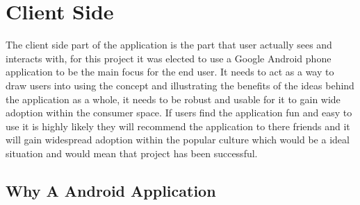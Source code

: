 \section{Client Side}


The client side part of the application is the part that user actually sees and interacts with, for this project it was elected to use a Google Android phone application to be the main focus for the end user. It needs to act as a way to draw users into using the concept and illustrating the benefits of the ideas behind the application as a whole, it needs to be robust and usable for it to gain wide adoption within the consumer space. If users find the application fun and easy to use it is highly likely they will recommend the application to there friends and it will gain widespread adoption within the popular culture which would be a ideal situation and would mean that project has been successful.\\

\subsection{Why A Android Application}


